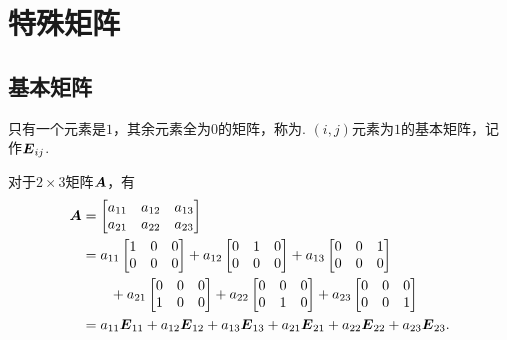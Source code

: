 \section{特殊矩阵}
\subsection{基本矩阵}
\begin{definition}
只有一个元素是\(1\)，其余元素全为\(0\)的矩阵，称为.
\((i,j)\)元素为\(1\)的基本矩阵，记作\(\boldsymbol{E}_{ij}\).
\end{definition}
\begin{example}
对于\(2\times3\)矩阵\(\boldsymbol{A}\)，有\begin{align*}
	\boldsymbol{A}
	&= \begin{bmatrix}
		a_{11} & a_{12} & a_{13} \\
		a_{21} & a_{22} & a_{23}
	\end{bmatrix} \\
	&= a_{11}
	\begin{bmatrix}
		1 & 0 & 0 \\
		0 & 0 & 0
	\end{bmatrix}
	+ a_{12}
	\begin{bmatrix}
		0 & 1 & 0 \\
		0 & 0 & 0
	\end{bmatrix}
	+ a_{13}
	\begin{bmatrix}
		0 & 0 & 1 \\
		0 & 0 & 0
	\end{bmatrix} \\
	&\hspace{20pt}
	+ a_{21}
	\begin{bmatrix}
		0 & 0 & 0 \\
		1 & 0 & 0
	\end{bmatrix}
	+ a_{22}
	\begin{bmatrix}
		0 & 0 & 0 \\
		0 & 1 & 0
	\end{bmatrix}
	+ a_{23}
	\begin{bmatrix}
		0 & 0 & 0 \\
		0 & 0 & 1
	\end{bmatrix} \\
	&=
	a_{11} \boldsymbol{E}_{11} + a_{12} \boldsymbol{E}_{12} + a_{13} \boldsymbol{E}_{13}
	+ a_{21} \boldsymbol{E}_{21} + a_{22} \boldsymbol{E}_{22} + a_{23} \boldsymbol{E}_{23}.
\end{align*}
\end{example}

